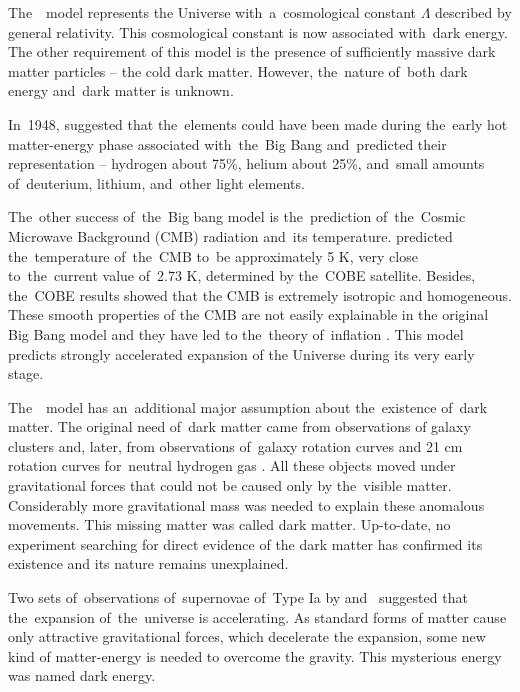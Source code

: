 The~\LCDM\ model represents the Universe with~a~cosmological constant \(\Lambda\) described by general relativity. This cosmological constant is now associated with~dark energy. The other requirement of this model is the presence of sufficiently massive dark matter particles -- the cold dark matter. However, the~nature of~both dark energy and~dark matter is unknown.

In~1948, \textcite{PhysRev.74.505.2} suggested that the~elements could have been made during the~early hot matter-energy phase associated with~the~Big Bang and~predicted their representation -- hydrogen about 75\%, helium about 25\%, and~small amounts of~deuterium, lithium, and~other light elements.

The~other success of~the~Big bang model is the~prediction of~the~Cosmic Microwave Background (CMB) radiation and~its temperature. \textcite{1948Natur.162..774A} predicted the~temperature of~the~CMB to~be approximately 5 K, very close to~the~current value of~2.73 K, determined by the~COBE satellite. Besides, the~COBE results showed that the CMB is extremely isotropic and homogeneous. These smooth properties of the CMB are not easily explainable in the original Big Bang model and they have led to the~theory of~inflation \parencite{1981PhRvD..23..347G}. This model predicts strongly accelerated expansion of the Universe during its very early stage.

The~\LCDM\ model has an~additional major assumption about the~existence of~dark matter. The original need of~dark matter came from observations of galaxy clusters \parencite{zwicky} and, later, from observations of~galaxy rotation curves \parencite{1980ApJ...238..471R} and 21 cm rotation curves for~neutral hydrogen gas \parencite{1978PhDT.......195B}. All these objects moved under gravitational forces that could not be caused only by the~visible matter. Considerably more gravitational mass was needed to explain these anomalous movements. This missing matter was called dark matter. Up-to-date, no experiment searching for direct evidence of the dark matter has confirmed its existence and its nature remains unexplained.

Two sets of~observations of~supernovae of~Type Ia by \textcite{riess} and~\textcite{1999ApJ...517..565P} suggested that the~expansion of~the~universe is accelerating. As standard forms of matter cause only attractive gravitational forces, which decelerate the expansion, some new kind of matter-energy is needed to overcome the gravity. This mysterious energy was named dark energy.

